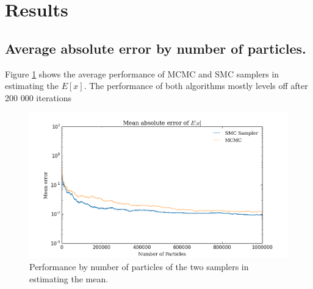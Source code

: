 \documentclass[12pt]{elsarticle}
\begin{document}


\section*{Results}
\subsection*{Average absolute error by number of particles. }
Figure \ref{ex} shows the average performance of MCMC and SMC samplers in estimating the $E[x]$. The performance of both algorithms mostly levels off after 200 000 iterations
\begin{figure}[htbp]
\begin{center}
\includegraphics[width = \textwidth]{plots/E_X.png}
\caption{Performance by number of particles of the two samplers in estimating the mean.}
\label{ex}
\end{center}
\end{figure}
\end{document}
